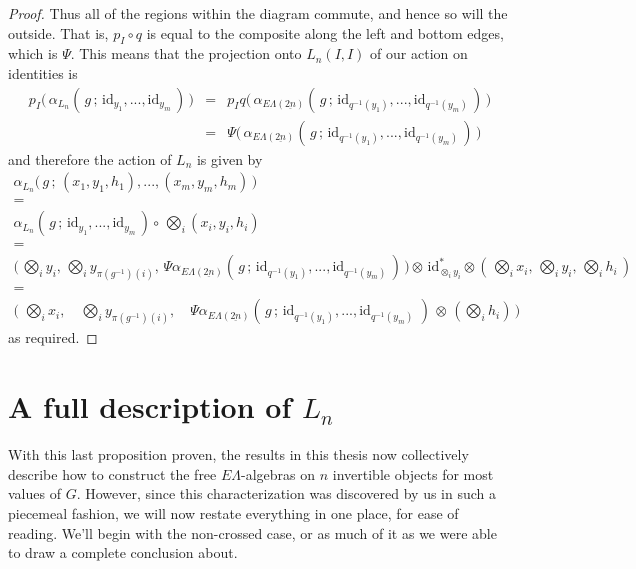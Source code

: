 \documentclass{amsbook} %
\newcommand{\ELnn}{E\Lambda(\underline{2n})}
\numberwithin{section}{chapter}
\begin{document}
\begin{proof}
Thus all of the regions within the diagram commute, and hence so will the outside. That is, $p_I \circ q$ is equal to the composite along the left and bottom edges, which is $\Psi$. This means that the projection onto $L_n(I,I)$ of our action on identities is
\[ \begin{array}{rll}
			p_I \big( \, \alpha_{L_n}( \, g \, ; \, \mathrm{id}_{y_1}, ..., \mathrm{id}_{y_m} \, ) \, \big) & = &  p_I q\big( \, \alpha_{\ELnn}( \, g \, ; \, \mathrm{id}_{q^{-1}(y_1)}, ..., \mathrm{id}_{q^{-1}(y_m)} \, ) \, \big) \\
			& = & \Psi \big( \, \alpha_{\ELnn}( \, g \, ; \, \mathrm{id}_{q^{-1}(y_1)}, ..., \mathrm{id}_{q^{-1}(y_m)} \, ) \, \big)
		\end{array}
\]
and therefore the action of $L_n$ is given by
\[ \begin{array}{c}
			\alpha_{L_n}\big( \, g \, ; \, (x_1, y_1, h_1), ..., (x_m, y_m, h_m) \, \big) \\
			= \\
			\alpha_{L_n}( \, g \, ; \, \mathrm{id}_{y_1}, ..., \mathrm{id}_{y_m} \, ) \circ \, \bigotimes_i (x_i, y_i, h_i) \\
			= \\
			\big( \, \bigotimes_i y_i, \, \bigotimes_i y_{\pi(g^{-1})(i)}, \, \Psi \alpha_{\ELnn}( \, g \, ; \, \mathrm{id}_{q^{-1}(y_1)}, ..., \mathrm{id}_{q^{-1}(y_m)} \, ) \, \big) \otimes \, \mathrm{id}_{\otimes_i y_i}^* \otimes ( \, \bigotimes_i x_i, \, \bigotimes_i y_i, \, \bigotimes_i h_i \, ) \\
			= \\
			\big( \, \, \bigotimes_i x_i, \quad \bigotimes_i y_{\pi(g^{-1})(i)}, \quad \Psi \alpha_{\ELnn}( \, g \, ; \, \mathrm{id}_{q^{-1}(y_1)}, ..., \mathrm{id}_{q^{-1}(y_m)} \, \, ) \, \otimes \, (\bigotimes_i h_i) \, \big) 
		\end{array}
\]
as required.
\end{proof}

\section{A full description of \texorpdfstring{$L_n$}{L_n}}

With this last proposition proven, the results in this thesis now collectively describe how to construct the free $E\Lambda$-algebras on $n$ invertible objects for most values of $G$. However, since this characterization was discovered by us in such a piecemeal fashion, we will now restate everything in one place, for ease of reading. We'll begin with the non-crossed case, or as much of it as we were able to draw a complete conclusion about.
\end{document}
